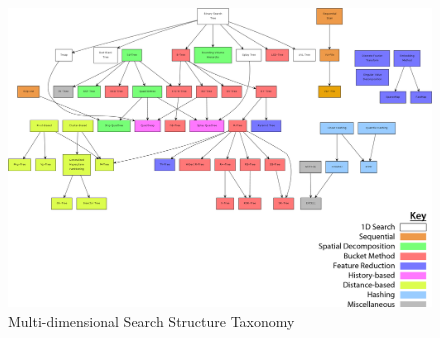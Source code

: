 \begin{landscape}
	\null  %
	\nointerlineskip  %
	\vfill
	\let\snewpage \newpage
	\let\newpage \relax
		\begin{figure}[H]
			\centering
			\includegraphics[scale=0.35]{figures/md_structure_taxonomy.png}
			\caption{Multi-dimensional Search Structure Taxonomy}
			\label{fig:structure-taxonomy}
		\end{figure}
	\let \newpage \snewpage
	\vfill 
	\break %

	\newpage

\end{landscape}